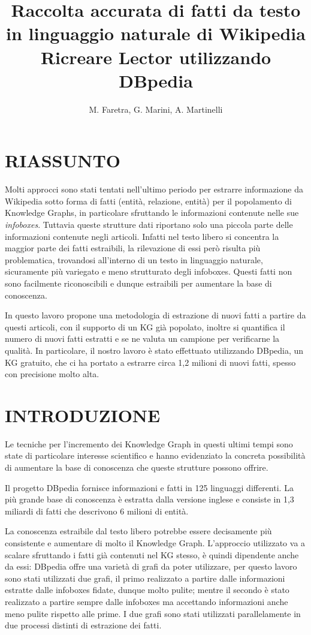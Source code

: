 \documentclass[10pt,a4paper,twocolumn]{article}
\author{M. Faretra, G. Marini, A. Martinelli}
\title{\textbf{Raccolta accurata di fatti da testo in linguaggio naturale di Wikipedia}\\Ricreare Lector utilizzando DBpedia}
\begin{document}
	
\maketitle
\thispagestyle{empty}
\pagestyle{empty}
		
\section*{RIASSUNTO}
		
Molti approcci sono stati tentati nell'ultimo periodo per estrarre informazione da Wikipedia sotto forma di fatti (entità, relazione, entità) per il popolamento di Knowledge Graphs, in particolare sfruttando le informazioni contenute nelle sue \textit{infoboxes}. Tuttavia queste strutture dati riportano solo una piccola parte delle informazioni contenute negli articoli. Infatti nel testo libero si concentra la maggior parte dei fatti estraibili, la rilevazione di essi però risulta più problematica, trovandosi all'interno di un testo in linguaggio naturale, sicuramente più variegato e meno strutturato degli infoboxes. Questi fatti non sono facilmente riconoscibili e dunque estraibili per aumentare la base di conoscenza. 

In questo lavoro propone una metodologia di estrazione di nuovi fatti a partire da questi articoli, con il supporto di un KG già popolato, inoltre si quantifica il numero di nuovi fatti estratti e se ne valuta un campione per verificarne la qualità. In particolare, il nostro lavoro è stato effettuato utilizzando DBpedia, un KG gratuito, che ci ha portato a estrarre circa 1,2 milioni di nuovi fatti, spesso con precisione molto alta.

\section{INTRODUZIONE} 

Le tecniche per l'incremento dei Knowledge Graph in questi ultimi tempi sono state di particolare interesse scientifico e hanno evidenziato la concreta possibilità di aumentare la base di conoscenza che queste strutture possono offrire.

Il progetto DBpedia fornisce informazioni e fatti in 125 linguaggi differenti. La più grande base di conoscenza è estratta dalla versione inglese e consiste in 1,3 miliardi di fatti che descrivono 6 milioni di entità. 

La conoscenza estraibile dal testo libero potrebbe essere decisamente più consistente e aumentare di molto il Knowledge Graph. L'approccio utilizzato va a scalare sfruttando i fatti già contenuti nel KG stesso, è quindi dipendente anche da essi: DBpedia offre una varietà di grafi da poter utilizzare, per questo lavoro sono stati utilizzati due grafi, il primo realizzato a partire dalle informazioni estratte dalle infoboxes fidate, dunque molto pulite; mentre il secondo è stato realizzato a partire sempre dalle infoboxes ma accettando informazioni anche meno pulite rispetto alle prime. I due grafi sono stati utilizzati parallelamente in due processi distinti di estrazione dei fatti.
\end{document}
